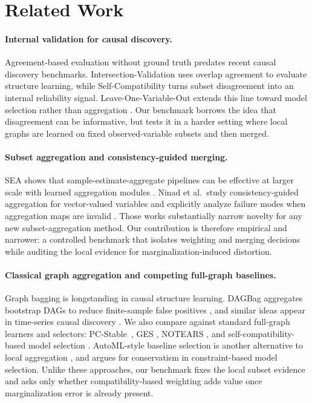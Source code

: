 \documentclass{article}
\newcommand{\pcstable}{PC-Stable}
\begin{document}
\section{Related Work}
\label{sec:related}

\paragraph{Internal validation for causal discovery.}
Agreement-based evaluation without ground truth predates recent causal discovery benchmarks. Intersection-Validation \citep{viinikka2018intersection} uses overlap agreement to evaluate structure learning, while Self-Compatibility \citep{faller2024selfcompatibility} turns subset disagreement into an internal reliability signal. Leave-One-Variable-Out extends this line toward model selection rather than aggregation \citep{schkoda2025lovo}. Our benchmark borrows the idea that disagreement can be informative, but tests it in a harder setting where local graphs are learned on fixed observed-variable subsets and then merged.

\paragraph{Subset aggregation and consistency-guided merging.}
SEA shows that sample-estimate-aggregate pipelines can be effective at larger scale with learned aggregation modules \citep{wu2025sample}. Ninad et al.\ study consistency-guided aggregation for vector-valued variables and explicitly analyze failure modes when aggregation maps are invalid \citep{ninad2025vector}. Those works substantially narrow novelty for any new subset-aggregation method. Our contribution is therefore empirical and narrower: a controlled benchmark that isolates weighting and merging decisions while auditing the local evidence for marginalization-induced distortion.

\paragraph{Classical graph aggregation and competing full-graph baselines.}
Graph bagging is longstanding in causal structure learning. DAGBag aggregates bootstrap DAGs to reduce finite-sample false positives \citep{wang2014dagbag}, and similar ideas appear in time-series causal discovery \citep{debeire2024bootstrap}. We also compare against standard full-graph learners and selectors: \pcstable\ \citep{colombo2014pcstable}, GES \citep{chickering2002ges}, NOTEARS \citep{zheng2018notears}, and self-compatibility-based model selection \citep{faller2024selfcompatibility}. AutoML-style baseline selection is another alternative to local aggregation \citep{chan2024autocd}, and \citet{malinsky2024cautious} argues for conservatism in constraint-based model selection. Unlike these approaches, our benchmark fixes the local subset evidence and asks only whether compatibility-based weighting adds value once marginalization error is already present.
\end{document}
